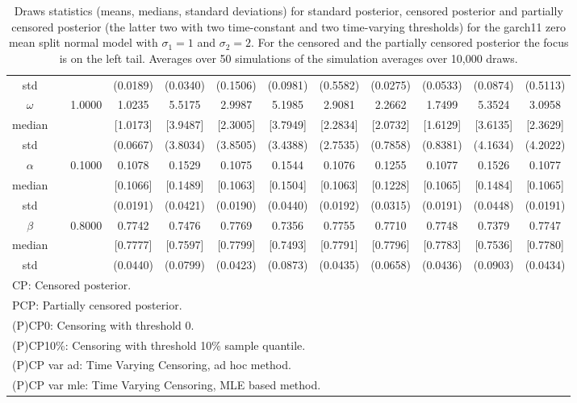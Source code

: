 {\begin{sidewaystable}
\begin{tabular}{cc cc cccc cccc}
std &&   & (0.0189) & (0.0340) & (0.1506) & (0.0981) & (0.5582) &(0.0275) & (0.0533) & (0.0874) & (0.5113)  \\ 
$\omega$&& 1.0000 & 1.0235 & 5.5175 & 2.9987 & 5.1985 & 2.9081 & 2.2662 & 1.7499 & 5.3524 & 3.0958  \\ 
median &&  & [1.0173] & [3.9487] & [2.3005] & [3.7949] & [2.2834] & [2.0732] & [1.6129] & [3.6135] & [2.3629]  \\ 
std &&   & (0.0667) & (3.8034) & (3.8505) & (3.4388) & (2.7535) &(0.7858) & (0.8381) & (4.1634) & (4.2022)  \\ 
$\alpha$&& 0.1000 & 0.1078 & 0.1529 & 0.1075 & 0.1544 & 0.1076 & 0.1255 & 0.1077 & 0.1526 & 0.1077  \\ 
median &&  & [0.1066] & [0.1489] & [0.1063] & [0.1504] & [0.1063] & [0.1228] & [0.1065] & [0.1484] & [0.1065]  \\ 
std &&   & (0.0191) & (0.0421) & (0.0190) & (0.0440) & (0.0192) &(0.0315) & (0.0191) & (0.0448) & (0.0191)  \\ 
$\beta$&& 0.8000 & 0.7742 & 0.7476 & 0.7769 & 0.7356 & 0.7755 & 0.7710 & 0.7748 & 0.7379 & 0.7747  \\ 
median &&  & [0.7777] & [0.7597] & [0.7799] & [0.7493] & [0.7791] & [0.7796] & [0.7783] & [0.7536] & [0.7780]  \\ 
std &&   & (0.0440) & (0.0799) & (0.0423) & (0.0873) & (0.0435) &(0.0658) & (0.0436) & (0.0903) & (0.0434)  \\ 
\hline 
\multicolumn{12}{l}{\footnotesize{CP: Censored posterior.}}  \\ 
\multicolumn{12}{l}{\footnotesize{PCP: Partially censored posterior.}} \\ 
\multicolumn{12}{l}{\footnotesize{(P)CP0: Censoring with threshold 0.}} \\ 
\multicolumn{12}{l}{\footnotesize{(P)CP10\%: Censoring with threshold 10\% sample quantile.}}  \\ 
\multicolumn{12}{l}{\footnotesize{(P)CP var ad: Time Varying Censoring, ad hoc method.}} \\ 
\multicolumn{12}{l}{\footnotesize{(P)CP var mle: Time Varying Censoring, MLE based method.}}  \\ 
\end{tabular}
 \caption{Draws statistics (means, medians, standard deviations) for standard posterior, censored posterior and partially censored posterior (the latter two with two time-constant and two time-varying thresholds) for the garch11 zero mean split normal model with $\sigma_{1} = 1$ and $\sigma_{2} = 2$. For the censored and the partially censored posterior the focus is on the left tail. Averages over 50 simulations of the simulation averages over 10,000 draws.} 
\label{tab:garch11_pcp_draws}  
\end{sidewaystable}
}